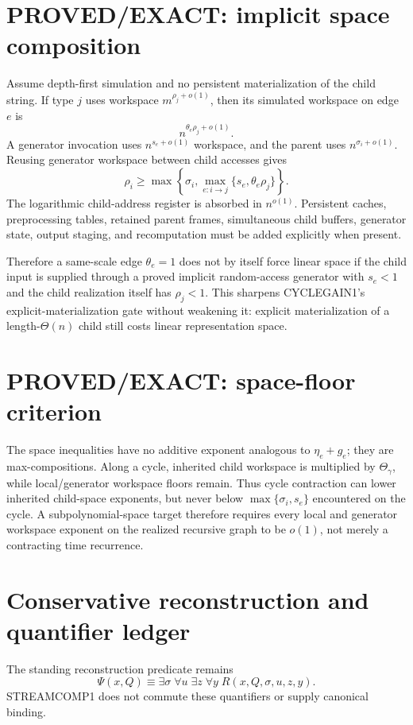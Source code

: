 \documentclass[11pt]{article}
\begin{document}
\section*{PROVED/EXACT: implicit space composition}
Assume depth-first simulation and no persistent materialization of the child string. If type \(j\) uses workspace \(m^{\rho_j+o(1)}\), then its simulated workspace on edge \(e\) is
\[
n^{\theta_e\rho_j+o(1)}.
\]
A generator invocation uses \(n^{s_e+o(1)}\) workspace, and the parent uses \(n^{\sigma_i+o(1)}\). Reusing generator workspace between child accesses gives
\[
\boxed{
\rho_i\ge
\max\left\{
\sigma_i,\max_{e:i\to j}\{s_e,\theta_e\rho_j\}
\right\}.
}
\]
The logarithmic child-address register is absorbed in \(n^{o(1)}\). Persistent caches, preprocessing tables, retained parent frames, simultaneous child buffers, generator state, output staging, and recomputation must be added explicitly when present.

Therefore a same-scale edge \(\theta_e=1\) does not by itself force linear space if the child input is supplied through a proved implicit random-access generator with \(s_e<1\) and the child realization itself has \(\rho_j<1\). This sharpens CYCLEGAIN1's explicit-materialization gate without weakening it: explicit materialization of a length-\(\Theta(n)\) child still costs linear representation space.

\section*{PROVED/EXACT: space-floor criterion}
The space inequalities have no additive exponent analogous to \(\eta_e+g_e\); they are max-compositions. Along a cycle, inherited child workspace is multiplied by \(\Theta_\gamma\), while local/generator workspace floors remain. Thus cycle contraction can lower inherited child-space exponents, but never below \(\max\{\sigma_i,s_e\}\) encountered on the cycle. A subpolynomial-space target therefore requires every local and generator workspace exponent on the realized recursive graph to be \(o(1)\), not merely a contracting time recurrence.

\section*{Conservative reconstruction and quantifier ledger}
The standing reconstruction predicate remains
\[
\Psi(x,Q)\equiv\exists\sigma\;\forall u\;\exists z\;\forall y\;R(x,Q,\sigma,u,z,y).
\]
STREAMCOMP1 does not commute these quantifiers or supply canonical binding.
\end{document}

